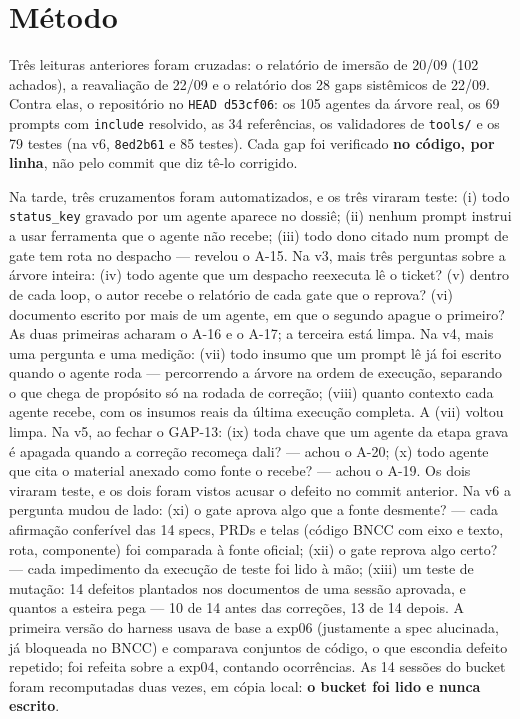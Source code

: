 \documentclass[11pt,a4paper]{article}
\begin{document}
\section{Método}

Três leituras anteriores foram cruzadas: o relatório de imersão de 20/09 (102 achados), a reavaliação de 22/09 e o relatório dos 28 gaps sistêmicos de 22/09. Contra elas, o repositório no \texttt{HEAD d53cf06}: os 105 agentes da árvore real, os 69 prompts com \texttt{include} resolvido, as 34 referências, os validadores de \texttt{tools/} e os 79 testes (na v6, \texttt{8ed2b61} e 85 testes). Cada gap foi verificado \textbf{no código, por linha}, não pelo commit que diz tê-lo corrigido.

Na tarde, três cruzamentos foram automatizados, e os três viraram teste: (i) todo \texttt{status\_key} gravado por um agente aparece no dossiê; (ii) nenhum prompt instrui a usar ferramenta que o agente não recebe; (iii) todo dono citado num prompt de gate tem rota no despacho --- revelou o A-15. Na v3, mais três perguntas sobre a árvore inteira: (iv) todo agente que um despacho reexecuta lê o ticket? (v) dentro de cada loop, o autor recebe o relatório de cada gate que o reprova? (vi) documento escrito por mais de um agente, em que o segundo apague o primeiro? As duas primeiras acharam o A-16 e o A-17; a terceira está limpa. Na v4, mais uma pergunta e uma medição: (vii) todo insumo que um prompt lê já foi escrito quando o agente roda --- percorrendo a árvore na ordem de execução, separando o que chega de propósito só na rodada de correção; (viii) quanto contexto cada agente recebe, com os insumos reais da última execução completa. A (vii) voltou limpa. Na v5, ao fechar o GAP-13: (ix) toda chave que um agente da etapa grava é apagada quando a correção recomeça dali? --- achou o A-20; (x) todo agente que cita o material anexado como fonte o recebe? --- achou o A-19. Os dois viraram teste, e os dois foram vistos acusar o defeito no commit anterior. Na v6 a pergunta mudou de lado: (xi) o gate aprova algo que a fonte desmente? --- cada afirmação conferível das 14 specs, PRDs e telas (código BNCC com eixo e texto, rota, componente) foi comparada à fonte oficial; (xii) o gate reprova algo certo? --- cada impedimento da execução de teste foi lido à mão; (xiii) um teste de mutação: 14 defeitos plantados nos documentos de uma sessão aprovada, e quantos a esteira pega --- 10 de 14 antes das correções, 13 de 14 depois. A primeira versão do harness usava de base a exp06 (justamente a spec alucinada, já bloqueada no BNCC) e comparava conjuntos de código, o que escondia defeito repetido; foi refeita sobre a exp04, contando ocorrências. As 14 sessões do bucket foram recomputadas duas vezes, em cópia local: \textbf{o bucket foi lido e nunca escrito}.
\end{document}
